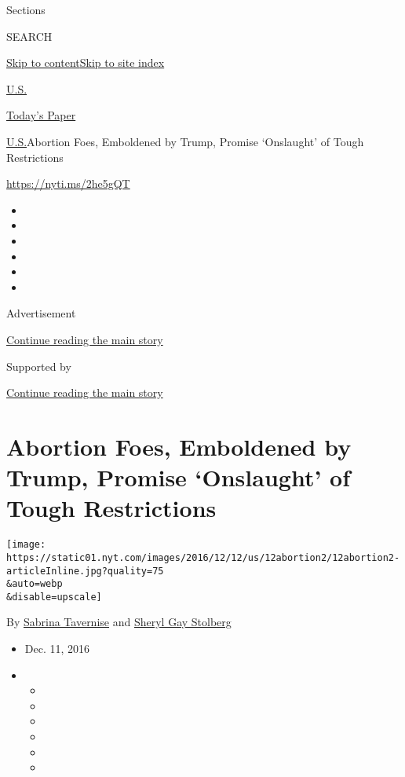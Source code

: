 Sections

SEARCH

\protect\hyperlink{site-content}{Skip to
content}\protect\hyperlink{site-index}{Skip to site index}

\href{https://www.nytimes.com/section/us}{U.S.}

\href{https://myaccount.nytimes.com/auth/login?response_type=cookie\&client_id=vi}{}

\href{https://www.nytimes.com/section/todayspaper}{Today's Paper}

\href{/section/us}{U.S.}\textbar{}Abortion Foes, Emboldened by Trump,
Promise `Onslaught' of Tough Restrictions

\url{https://nyti.ms/2he5gQT}

\begin{itemize}
\item
\item
\item
\item
\item
\item
\end{itemize}

Advertisement

\protect\hyperlink{after-top}{Continue reading the main story}

Supported by

\protect\hyperlink{after-sponsor}{Continue reading the main story}

\hypertarget{abortion-foes-emboldened-by-trump-promise-onslaught-of-tough-restrictions}{%
\section{Abortion Foes, Emboldened by Trump, Promise `Onslaught' of
Tough
Restrictions}\label{abortion-foes-emboldened-by-trump-promise-onslaught-of-tough-restrictions}}

\texttt{[image: https://static01.nyt.com/images/2016/12/12/us/12abortion2/12abortion2-articleInline.jpg?quality=75\\\&auto=webp\\\&disable=upscale]}

By \href{http://www.nytimes.com/by/sabrina-tavernise}{Sabrina Tavernise}
and \href{http://www.nytimes.com/by/sheryl-gay-stolberg}{Sheryl Gay
Stolberg}

\begin{itemize}
\item
  Dec. 11, 2016
\item
  \begin{itemize}
  \item
  \item
  \item
  \item
  \item
  \item
  \end{itemize}
\end{itemize}


